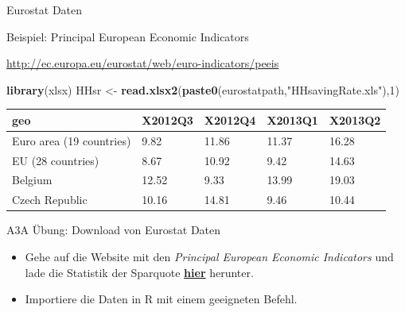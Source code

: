\documentclass[ignorenonframetext,]{beamer}
\newenvironment{Shaded}{\begin{snugshade}}{\end{snugshade}}
\newcommand{\DecValTok}[1]{\textcolor[rgb]{0.27,0.67,0.26}{#1}}
\newcommand{\KeywordTok}[1]{\textcolor[rgb]{0.26,0.66,0.93}{\textbf{#1}}}
\newcommand{\NormalTok}[1]{\textcolor[rgb]{0.74,0.68,0.62}{#1}}
\newcommand{\StringTok}[1]{\textcolor[rgb]{0.02,0.61,0.04}{#1}}
\providecommand{\tightlist}{%
  \setlength{\itemsep}{0pt}\setlength{\parskip}{0pt}}
\begin{document}
\begin{frame}[fragile]{Eurostat Daten}
\protect\hypertarget{eurostat-daten}{}

\begin{block}{Beispiel: Principal European Economic Indicators}

\url{http://ec.europa.eu/eurostat/web/euro-indicators/peeis}

\begin{Shaded}
\begin{Highlighting}[]
\KeywordTok{library}\NormalTok{(xlsx)}
\NormalTok{HHsr <-}\StringTok{ }\KeywordTok{read.xlsx2}\NormalTok{(}\KeywordTok{paste0}\NormalTok{(eurostatpath,}\StringTok{"HHsavingRate.xls"}\NormalTok{),}\DecValTok{1}\NormalTok{)}
\end{Highlighting}
\end{Shaded}

\begin{longtable}[]{@{}lllll@{}}
\toprule
geo & X2012Q3 & X2012Q4 & X2013Q1 & X2013Q2\tabularnewline
\midrule
\endhead
Euro area (19 countries) & 9.82 & 11.86 & 11.37 & 16.28\tabularnewline
EU (28 countries) & 8.67 & 10.92 & 9.42 & 14.63\tabularnewline
Belgium & 12.52 & 9.33 & 13.99 & 19.03\tabularnewline
Czech Republic & 10.16 & 14.81 & 9.46 & 10.44\tabularnewline
\bottomrule
\end{longtable}

\end{block}

\end{frame}

\begin{frame}{A3A Übung: Download von Eurostat Daten}
\protect\hypertarget{a3a-ubung-download-von-eurostat-daten}{}

\begin{itemize}
\tightlist
\item
  Gehe auf die Website mit den \emph{Principal European Economic
  Indicators} und lade die Statistik der Sparquote
  \href{http://ec.europa.eu/eurostat/web/euro-indicators/peeis}{\textbf{hier}}
  herunter.
\item
  Importiere die Daten in R mit einem geeigneten Befehl.
\end{itemize}

\end{frame}
\end{document}
